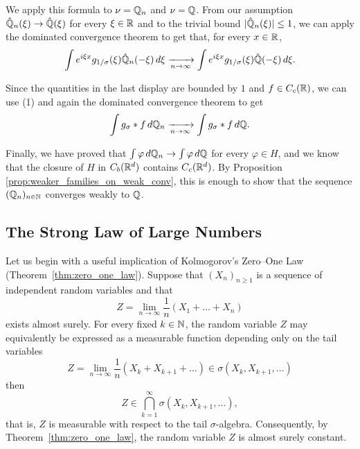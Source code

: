 \documentclass[../Main.tex]{subfiles}
\begin{document}
{We apply this formula to $\nu=\mathbb{Q}_n$ and $\nu=\mathbb{Q}$. From our assumption
$\hat{\mathbb{Q}}_n(\xi)\to\hat{\mathbb{Q}}(\xi)$ for every $\xi\in\mathbb{R}$ and to the trivial bound
$|\hat{\mathbb{Q}}_n(\xi)|\le1$, we can apply the dominated convergence theorem to get that, for every
$x\in\mathbb{R}$,
\[ \int e^{i\xi x} g_{1/\sigma}(\xi)\hat{\mathbb{Q}}_n(-\xi)\,d\xi \xrightarrow[n\to\infty]{} \int e^{i\xi x} g_{1/\sigma}(\xi)\hat{\mathbb{Q}}(-\xi)\,d\xi . \]

Since the quantities in the last display are bounded by $1$ and $f\in C_c(\mathbb{R})$, we can use (1) and again the dominated convergence theorem to get
\[ \int g_\sigma * f\, d\mathbb{Q}_n \xrightarrow[n\to\infty]{} \int g_\sigma * f\, d\mathbb{Q} . \]

Finally, we have proved that $\int \varphi\, d\mathbb{Q}_n \to \int \varphi\, d\mathbb{Q}$ for every
$\varphi\in H$, and we know that the closure of $H$ in $C_b(\mathbb{R}^d)$ contains
$C_c(\mathbb{R}^d)$. By Proposition \ref{prop:weaker_families_on_weak_conv}, this is enough to show that the sequence
$(\mathbb{Q}_n)_{n\in\mathbb{N}}$ converges weakly to $\mathbb{Q}$. 
}




\subsection{The Strong Law of Large Numbers}
Let us begin with a useful implication of Kolmogorov's Zero--One Law (Theorem~\ref{thm:zero_one_law}). Suppose that $(X_n)_{n\ge 1}$ is a sequence of independent random variables and that
\[ Z=\lim_{n\to\infty} \frac{1}{n}(X_1+\ldots+X_n) \]
exists almost surely. For every fixed $k\in\mathbb{N}$, the random variable $Z$ may equivalently be expressed as a measurable function depending only on the tail variables
\[ Z =  \lim_{n\to\infty} \frac{1}{n}(X_k+X_{k+1}+\ldots) \in \sigma(X_k, X_{k+1},\ldots)  \]
then
\[ Z\in\bigcap_{k=1}^{\infty}\sigma(X_k,X_{k+1},\ldots), \]
that is, $Z$ is measurable with respect to the tail $\sigma$-algebra. Consequently, by Theorem~\ref{thm:zero_one_law}, the random variable $Z$ is almost surely constant.
\end{document}
